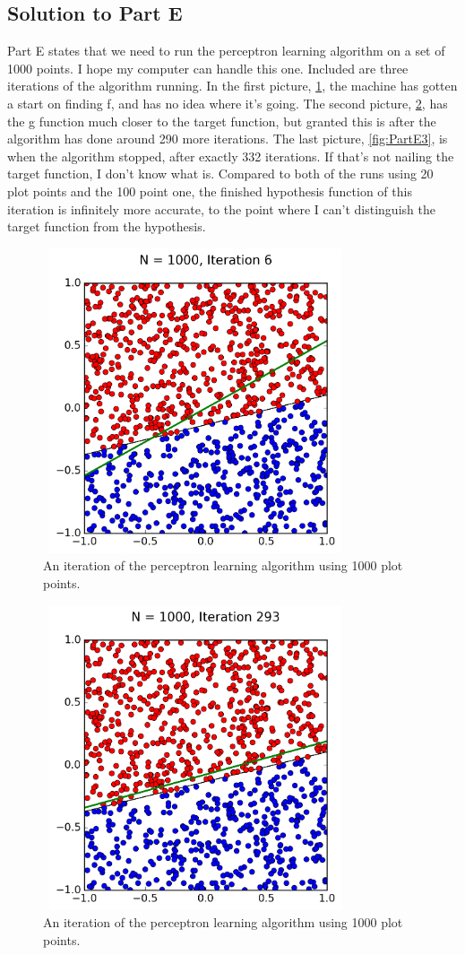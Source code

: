 \documentclass[a4paper]{article}
\begin{document}
\subsection{Solution to Part E}
Part E states that we need to run the perceptron learning algorithm on a set of 1000 points. I hope my computer can handle this one.  Included are three iterations of the algorithm running. In the first picture, \ref{fig:PartE1}, the machine has gotten a start on finding f, and has no idea where it's going. The second picture, \ref{fig:PartE2}, has the g function much closer to the target function, but granted this is after the algorithm has done around 290 more iterations. The last picture, \ref{fig:PartE3}, is when the algorithm stopped, after exactly 332 iterations. If that's not nailing the target function, I don't know what is. Compared to both of the runs using 20 plot points and the 100 point one, the finished hypothesis function of this iteration is infinitely more accurate, to the point where I can't distinguish the target function from the hypothesis.
\begin{figure}
  \includegraphics[width=9cm,height=9cm]{p_N1000_it6.png}
  \caption{An iteration of the perceptron learning algorithm using 1000 plot points.}
  \label{fig:PartE1}
\end{figure}
\begin{figure}
  \includegraphics[width=9cm,height=9cm]{p_N1000_it293.png}
  \caption{An iteration of the perceptron learning algorithm using 1000 plot points.}
  \label{fig:PartE2}
\end{figure}
\end{document}
